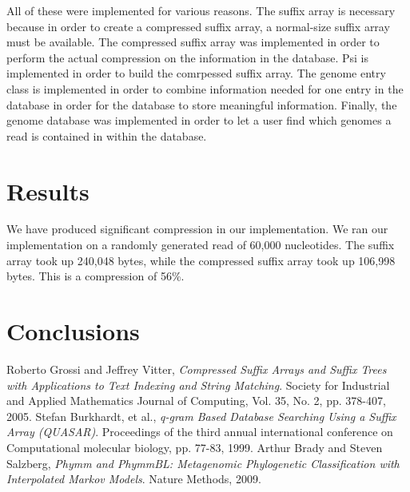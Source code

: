 \documentclass{article}
\begin{document}
\indent All of these were implemented for various reasons. The suffix array is necessary because in order to create a compressed suffix array, a normal-size suffix array must be available. The compressed suffix array was implemented in order to perform the actual compression on the information in the database. Psi is implemented in order to build the comrpessed suffix array. The genome entry class is implemented in order to combine information needed for one entry in the database in order for the database to store meaningful information. Finally, the genome database was implemented in order to let a user find which genomes a read is contained in within the database.\\
\section{Results}
We have produced significant compression in our implementation. We ran our implementation on a randomly generated read of 60,000 nucleotides. The suffix array took up 240,048 bytes, while the compressed suffix array took up 106,998 bytes. This is a compression of 56\%.\\
\section{Conclusions}
\begin{thebibliography}{1}
	Roberto Grossi and Jeffrey Vitter,
	\emph{Compressed Suffix Arrays and Suffix Trees with Applications to Text Indexing and String Matching}.
	Society for Industrial and Applied Mathematics Journal of Computing,
	Vol. 35, No. 2, pp. 378-407,
	2005.
	Stefan Burkhardt, et al.,
	\emph{q-gram Based Database Searching Using a Suffix Array (QUASAR)}.
	Proceedings of the third annual international conference on Computational molecular biology,
	pp. 77-83,
	1999.
	Arthur Brady and Steven Salzberg,
	\emph{Phymm and PhymmBL: Metagenomic Phylogenetic Classification with Interpolated Markov Models}.
	Nature Methods,
	2009.
\end{thebibliography}
\end{document}
